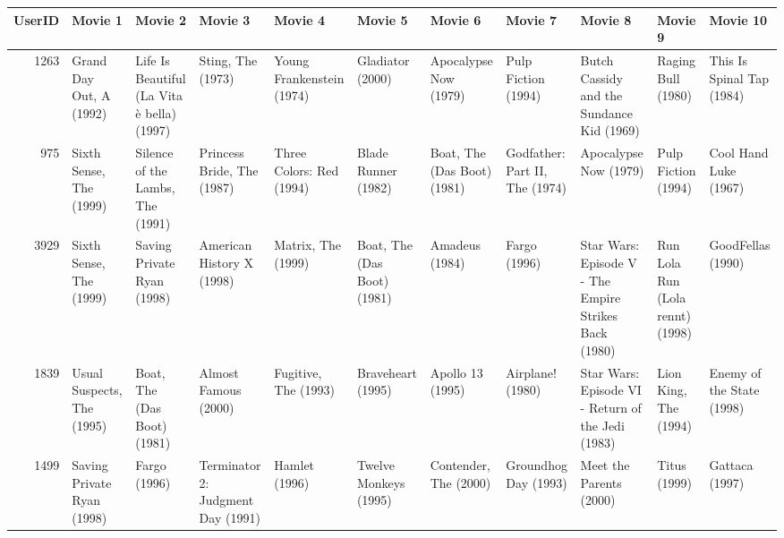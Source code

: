 \begin{tabular}{rllllllllll}
\toprule
UserID & Movie 1 & Movie 2 & Movie 3 & Movie 4 & Movie 5 & Movie 6 & Movie 7 & Movie 8 & Movie 9 & Movie 10 \\
\midrule
1263 & Grand Day Out, A (1992) & Life Is Beautiful (La Vita è bella) (1997) & Sting, The (1973) & Young Frankenstein (1974) & Gladiator (2000) & Apocalypse Now (1979) & Pulp Fiction (1994) & Butch Cassidy and the Sundance Kid (1969) & Raging Bull (1980) & This Is Spinal Tap (1984) \\
975 & Sixth Sense, The (1999) & Silence of the Lambs, The (1991) & Princess Bride, The (1987) & Three Colors: Red (1994) & Blade Runner (1982) & Boat, The (Das Boot) (1981) & Godfather: Part II, The (1974) & Apocalypse Now (1979) & Pulp Fiction (1994) & Cool Hand Luke (1967) \\
3929 & Sixth Sense, The (1999) & Saving Private Ryan (1998) & American History X (1998) & Matrix, The (1999) & Boat, The (Das Boot) (1981) & Amadeus (1984) & Fargo (1996) & Star Wars: Episode V - The Empire Strikes Back (1980) & Run Lola Run (Lola rennt) (1998) & GoodFellas (1990) \\
1839 & Usual Suspects, The (1995) & Boat, The (Das Boot) (1981) & Almost Famous (2000) & Fugitive, The (1993) & Braveheart (1995) & Apollo 13 (1995) & Airplane! (1980) & Star Wars: Episode VI - Return of the Jedi (1983) & Lion King, The (1994) & Enemy of the State (1998) \\
1499 & Saving Private Ryan (1998) & Fargo (1996) & Terminator 2: Judgment Day (1991) & Hamlet (1996) & Twelve Monkeys (1995) & Contender, The (2000) & Groundhog Day (1993) & Meet the Parents (2000) & Titus (1999) & Gattaca (1997) \\
\bottomrule
\end{tabular}
